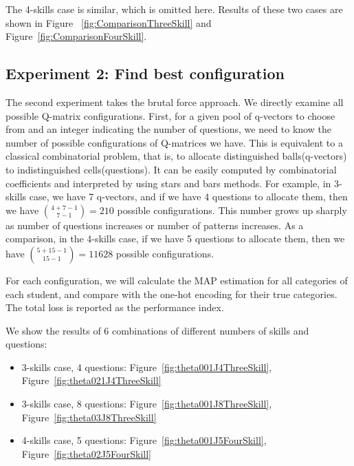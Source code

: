 \documentclass{edm_template}
\newcommand{\Michel}[1]{{\textcolor{red}{[#1]}}}
\begin{document}
The 4-skills case is similar, which is omitted here. Results of these two cases are shown in Figure ~\ref{fig:ComparisonThreeSkill} and Figure~\ref{fig:ComparisonFourSkill}.

\subsection{Experiment 2: Find best configuration}
The second experiment takes the brutal force approach. We directly examine all possible Q-matrix configurations. First, for a given pool of q-vectors to choose from and an integer indicating the number of questions, we need to know the number of possible configurations of Q-matrices we have. This is equivalent to a classical combinatorial problem, that is, to allocate distinguished balls(q-vectors) to indistinguished cells(questions). It can be easily computed by combinatorial coefficients and interpreted by using stars and bars methods. For example, in 3-skills case, we have 7 q-vectors, and if we have 4 questions to allocate them, then we have ${{4+7-1}\choose {7-1}}=210$ possible configurations. This number grows up sharply as number of questions increases or number of patterns increases. As a comparison, in the 4-skills case, if we have 5 questions to allocate them, then we have ${{5+15-1}\choose {15-1}}=11628$ possible configurations. 

For each configuration, we will calculate the MAP estimation for all categories of each student, and compare with the one-hot encoding for their true categories. The total loss is reported as the performance index.

We show the results of 6 combinations of different numbers of skills and questions: 
\begin{itemize}
\item 3-skills case, 4 questions: Figure~\ref{fig:theta001J4ThreeSkill}, Figure~\ref{fig:theta021J4ThreeSkill}
\item 3-skills case, 8 questions: Figure~\ref{fig:theta001J8ThreeSkill}, Figure~\ref{fig:theta03J8ThreeSkill}
\item 4-skills case, 5 questions: Figure~\ref{fig:theta001J5FourSkill}, Figure~\ref{fig:theta02J5FourSkill}
\end{itemize}

\end{document}
